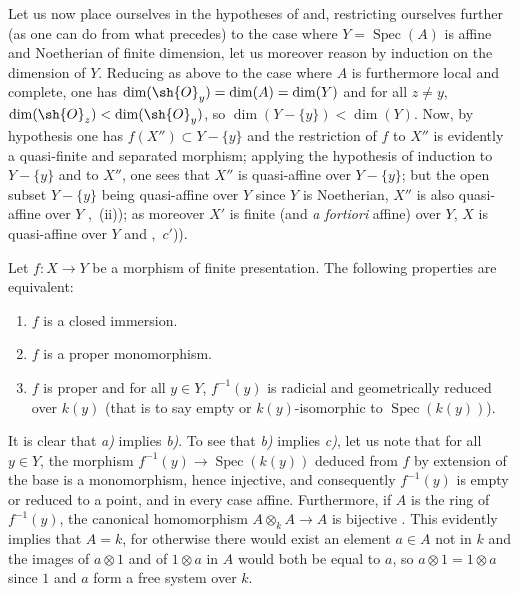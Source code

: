 Let us now place ourselves in the hypotheses of  and, restricting ourselves further (as one can do from what precedes) to the case where $Y=\operatorname{Spec}(A)$ is affine and Noetherian of finite dimension, let us moreover reason by induction on the dimension of $Y$.
Reducing as above to the case where $A$ is furthermore local and complete, one has $\dim(\sh{O}_y)=\dim(A)=\dim(Y)$ and for all $z\neq y$, $\dim(\sh{O}_z)<\dim(\sh{O}_y)$, so $\dim(Y-\{y\})<\dim(Y)$.
Now, by hypothesis one has $f(X'')\subset Y-\{y\}$ and the restriction of $f$ to $X''$ is evidently a quasi-finite and separated morphism; applying the hypothesis of induction to $Y-\{y\}$ and to $X''$, one sees that $X''$ is quasi-affine over $Y-\{y\}$; but the open subset $Y-\{y\}$ being quasi-affine over $Y$ since $Y$ is Noetherian, $X''$ is also quasi-affine over $Y$ ,~(ii)); as moreover $X'$ is finite (and \emph{a fortiori} affine) over $Y$, $X$ is quasi-affine over $Y$  and ,~$c'$)).

\begin{proposition}[8.11.5]
\label{IV.8.11.5}
Let $f:X\to Y$ be a morphism of finite presentation.
The following properties are equivalent:
\begin{enumerate}[label=\emph{\alph*)}]
  \item $f$ is a closed immersion.
  \item $f$ is a proper monomorphism.
  \item $f$ is proper and for all $y\in Y$, $f^{-1}(y)$ is radicial and geometrically reduced over $k(y)$ (that is to say empty or $k(y)$-isomorphic to $\operatorname{Spec}(k(y))$).
\end{enumerate}
\end{proposition}

It is clear that \emph{a)} implies \emph{b)}.
To see that \emph{b)} implies \emph{c)}, let us note  that for all $y\in Y$, the morphism $f^{-1}(y)\to\operatorname{Spec}(k(y))$ deduced from $f$ by extension of the base is a monomorphism, hence injective, and consequently $f^{-1}(y)$ is empty or reduced to a point, and in every case affine.
Furthermore, if $A$ is the ring of $f^{-1}(y)$, the canonical homomorphism $A\otimes_k A\to A$ is bijective .
This evidently implies that $A=k$, for otherwise there would exist an element $a\in A$ not in $k$ and the images of $a\otimes 1$ and of $1\otimes a$ in $A$ would both be equal to $a$, so $a\otimes 1=1\otimes a$ since $1$ and $a$ form a free system over $k$.

